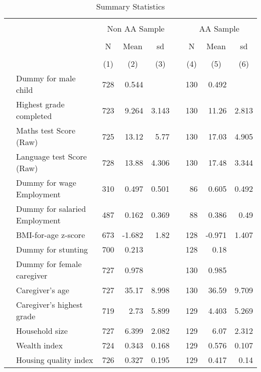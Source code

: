 \begin{table}[ht]
\centering
\caption{Summary Statistics} 
\label{tab:sum-stat}
\begin{tabular}{llrrrlrrr}
  \toprule
   \\[-1.8ex]  & & \multicolumn{3}{c}{Non AA Sample} & & \multicolumn{3}{c}{AA Sample}  \\[0.2ex] \cline{3-5}  \cline{7-9}  \\[-1.2ex]  & & \multicolumn{1}{c}{N} & \multicolumn{1}{c}{Mean} & \multicolumn{1}{c}{sd} & & \multicolumn{1}{c}{N} & \multicolumn{1}{c}{Mean} & \multicolumn{1}{c}{sd} \\  \\[-1.8ex] &  & \multicolumn{1}{c}{(1)} & \multicolumn{1}{c}{(2)} & \multicolumn{1}{c}{(3)} & & 
  \multicolumn{1}{c}{(4)} & \multicolumn{1}{c}{(5)} & \multicolumn{1}{c}{(6)} \\  \midrule
 & Dummy for male child &   728 & 0.544 &  &  &   130 & 0.492 &  \\ 
   & Highest grade completed &   723 & 9.264 & 3.143 &  &   130 & 11.26 & 2.813 \\ 
   & Maths test Score (Raw) &   725 & 13.12 &  5.77 &  &   130 & 17.03 & 4.905 \\ 
   & Language test Score (Raw) &   728 & 13.88 & 4.306 &  &   130 & 17.48 & 3.344 \\ 
   & Dummy for wage Employment &   310 & 0.497 & 0.501 &  &    86 & 0.605 & 0.492 \\ 
   & Dummy for salaried Employment &   487 & 0.162 & 0.369 &  &    88 & 0.386 &  0.49 \\ 
   & BMI-for-age z-score &   673 & -1.682 &  1.82 &  &   128 & -0.971 & 1.407 \\ 
   & Dummy for stunting &   700 & 0.213 &  &  &   128 &  0.18 &  \\ 
   & Dummy for female caregiver &   727 & 0.978 &  &  &   130 & 0.985 &  \\ 
   & Caregiver's age &   727 & 35.17 & 8.998 &  &   130 & 36.59 & 9.709 \\ 
   & Caregiver's highest grade &   719 &  2.73 & 5.899 &  &   129 & 4.403 & 5.269 \\ 
   & Household size &   727 & 6.399 & 2.082 &  &   129 &  6.07 & 2.312 \\ 
   & Wealth index &   724 & 0.343 & 0.168 &  &   129 & 0.576 & 0.107 \\ 
   & Housing quality index &   726 & 0.327 & 0.195 &  &   129 & 0.417 &  0.14 \\ 

\end{tabular}
\end{table}
